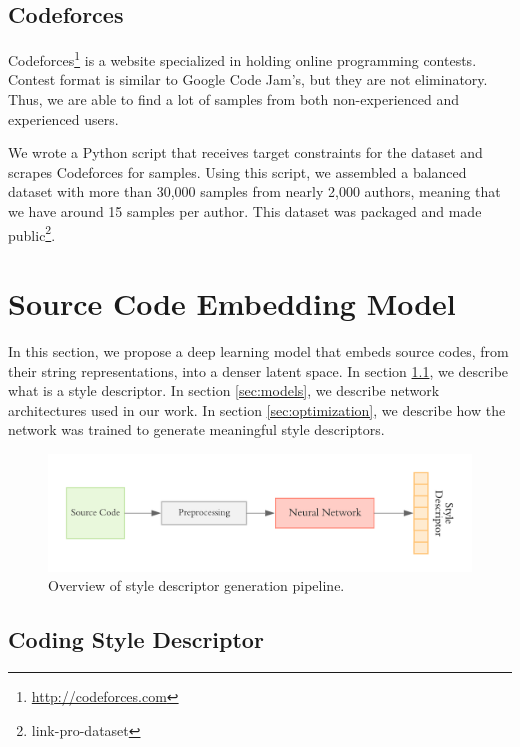 \subsection{Codeforces}\label{sec:codeforces}

Codeforces\footnote{\url{http://codeforces.com}} is a website specialized in holding online programming contests. Contest format is similar to Google Code Jam's, but they are not eliminatory. Thus, we are able to find a lot of samples from both non-experienced and experienced users.

We wrote a Python script that receives target constraints for the dataset and scrapes Codeforces for samples. Using this script, we assembled a balanced dataset with more than 30,000 samples from nearly 2,000 authors, meaning that we have around 15 samples per author. This dataset was packaged and made public\footnote{link-pro-dataset}.

\section{Source Code Embedding Model}\label{sec:framework}

In this section, we propose a deep learning model that embeds source codes, from their string representations, into a denser latent space. In section \ref{sec:descriptor}, we describe what is a style descriptor. In section \ref{sec:models}, we describe network architectures used in our work. In section \ref{sec:optimization}, we describe how the network was trained to generate meaningful style descriptors.

\begin{figure}[ht]
	\centering
	\includegraphics[width=\linewidth]{imgs/lstm.pdf}
	\caption{Overview of style descriptor generation pipeline.}
	\label{fig:overall}
\end{figure}

\subsection{Coding Style Descriptor}\label{sec:descriptor}


